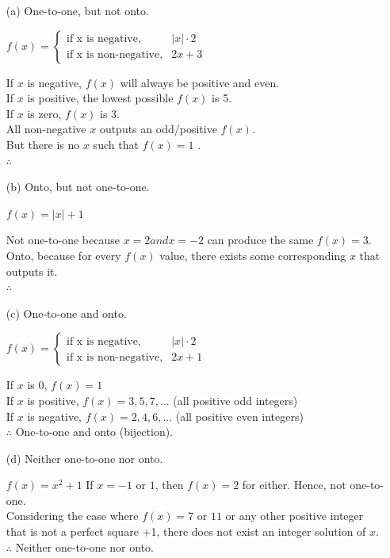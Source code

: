 \documentclass[14pt]{extreport}
\begin{document}
\begin{enumerate}
    \item[(a)] One-to-one, but not onto. 
        
        $f(x) = \begin{cases} \text{if x is negative,} & |x| \cdot 2 \\ \text{if x is non-negative,} & 2x+3 \end{cases}  $
        
        If $x$ is negative, $f(x)$ will always be positive and even. \\
        If $x$ is positive, the lowest possible $f(x)$ is 5. \\
        If $x$ is zero, $f(x)$ is 3. \\
        All non-negative $x$ outputs an odd/positive $f(x)$. \\
        But there is no $x$ such that $f(x) = 1$ . \\
        $\therefore$  
        \newline
        
        \item[(b)] Onto, but not one-to-one. 
        
        $f(x) = |x|+1$
        
        Not one-to-one because $x=2 and x=-2$ can produce the same $f(x) = 3$. \\
        Onto, because for every $f(x)$ value, there exists some corresponding $x$ that outputs it. \\
        $\therefore$  
        \newline
        
        \item[(c)] One-to-one and onto. 
        
        $f(x) = \begin{cases} \text{if x is negative,} & |x| \cdot 2 \\ \text{if x is non-negative,} & 2x+1 \end{cases}  $
        
        If $x$ is 0, $f(x) = 1$\\
        If $x$ is positive, $f(x) = 3, 5, 7, ...$ (all positive odd integers)\\
        If $x$ is negative, $f(x) = 2, 4, 6, ...$ (all positive even integers)\\
        $\therefore$ One-to-one and onto (bijection).
        \newline
        
        \item[(d)] Neither one-to-one nor onto. 
        
        $f(x) = x^2 +1$
        If $x=-1 \text{ or } 1$, then $f(x) = 2$ for either. Hence, not one-to-one.\\ 
        Considering the case where $f(x) = 7 \text{ or } 11$ or any other positive integer that is not a perfect square +1, there does not exist an integer solution of $x$. \\
        $\therefore$ Neither one-to-one nor onto. 
\end{enumerate}
\newpage
\end{document}
